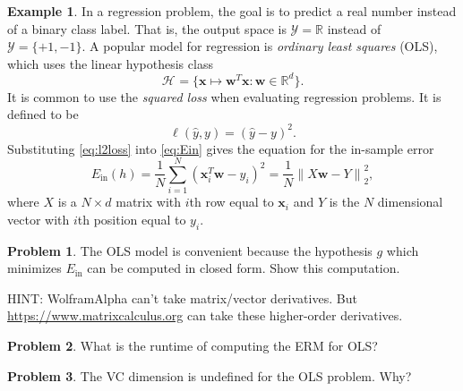 \documentclass[10pt]{exam}
\theoremstyle{definition}
\newtheorem{problem}{Problem}
\newtheorem{example}{Example}
\newcommand{\R}{\mathbb R}
\DeclareMathOperator*{\argmin}{arg\,min}
\newcommand{\Ein}{E_{\text{in}}}
\newcommand{\trans}[1]{{#1}^{T}}
\newcommand{\w}{\mathbf w}
\newcommand{\x}{\mathbf x}
\newcommand{\ltwo}[1]{{\lVert {#1} \rVert}_2}
\newcommand{\HH}[1]{\mathcal H_{\text{#1}}}
\begin{document}
\begin{example}
    In a regression problem, the goal is to predict a real number instead of a binary class label.
    That is, the output space is $\mathcal Y=\R$ instead of $\mathcal Y = \{+1, -1\}$.
    A popular model for regression is \emph{ordinary least squares} (OLS), which uses the linear hypothesis class
    \begin{equation}
        \HH{} = \bigg\{ \x \mapsto \trans\w \x : \w \in \R^d \bigg\}.
    \end{equation}
    It is common to use the \emph{squared loss} when evaluating regression problems.
    It is defined to be
    \begin{equation}
        \label{eq:l2loss}
        \ell(\hat y, y) = (\hat y - y)^2
        .
    \end{equation}
    Substituting \eqref{eq:l2loss} into \eqref{eq:Ein} gives the equation for the in-sample error
    \begin{equation}
        \Ein(h) 
        = \frac{1}{N}\sum_{i=1}^N (\trans\x_i \w - y_i)^2
        = \frac{1}{N}\ltwo{X\w - Y}^2,
    \end{equation}
    where $X$ is a $N \times d$ matrix with $i$th row equal to $\x_i$ and $Y$ is the $N$ dimensional vector with $i$th position equal to $y_i$.
\end{example}


\begin{problem}
    The OLS model is convenient because the hypothesis $g$ which minimizes $\Ein$ can be computed in closed form.
    Show this computation.

    HINT: WolframAlpha can't take matrix/vector derivatives.
    But \url{https://www.matrixcalculus.org} can take these higher-order derivatives.
\end{problem}

\newpage
\begin{problem}
    What is the runtime of computing the ERM for OLS?
\end{problem}

\vspace{4in}
\begin{problem}
    The VC dimension is undefined for the OLS problem.
    Why?
\end{problem}
\end{document}
